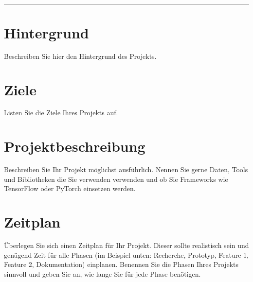 \documentclass[a4paper, 11pt]{scrartcl}
\title{\thema}
\author{\name \hspace{.5em} (\matnr) \\ \href{mailto:\email}{\email}}
\date{\datum}
\makeatletter
\renewcommand{\maketitle}{\bgroup\setlength{\parindent}{0pt}
\begin{flushleft}
  {\Large\sffamily \textbf{\@title}}\\[.4em]
  {\large\sffamily \@author} \hfill   {\large\sffamily \@date}
  \noindent
  \color{fhblue}\rule{\textwidth}{1mm}\color{black}
  \vspace*{.2em}
\end{flushleft}\egroup
}
\makeatother
\begin{document}
\maketitle
\thispagestyle{empty}

\section*{Hintergrund}
Beschreiben Sie hier den Hintergrund des Projekts.

\section*{Ziele}
Listen Sie die Ziele Ihres Projekts auf.

\section*{Projektbeschreibung}
Beschreiben Sie Ihr Projekt möglichst ausführlich. Nennen Sie gerne Daten, Tools und Bibliotheken die Sie verwenden verwenden und ob Sie Frameworks wie TensorFlow \cite{tensorflow2015} oder PyTorch \cite{pytorch2019} einsetzen werden.

\section*{Zeitplan}
Überlegen Sie sich einen Zeitplan für Ihr Projekt. Dieser sollte realistisch sein und genügend Zeit für alle Phasen (im Beispiel unten: Recherche, Prototyp, Feature 1, Feature 2, Dokumentation) einplanen.
Benennen Sie die Phasen Ihres Projekts sinnvoll und geben Sie an, wie lange Sie für jede Phase benötigen.

\noindent %
\end{document}
